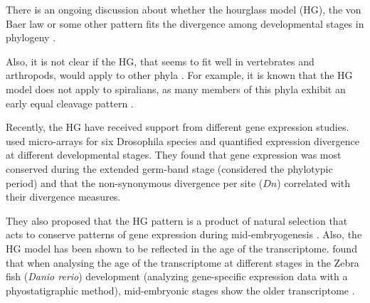 There is an ongoing discussion about whether the hourglass model (HG), the von Baer law
or some other pattern fits the divergence among developmental stages in phylogeny \citep{Richardson1997,Poe2004,Kalinka2012}.

Also, it is not clear if the HG, that seems to fit well in vertebrates and arthropods, would apply to other phyla \citep{Raff1996} \citep{Salazar-Ciudad2010}. For example, it is known that the HG model does not apply to spiralians, as many members of this phyla exhibit an early equal cleavage pattern \citep{Henry2002}.

Recently, the HG have received support from different gene expression studies.
\citet{Kalinka2010} used micro-arrays for six Drosophila species and quantified expression divergence at different developmental stages. They found that gene expression was most conserved during the extended germ-band stage (considered the phylotypic period) and that the non-synonymous divergence per site ($Dn$) correlated with their divergence measures.

They also proposed that the HG pattern is a product of natural selection that acts to conserve patterns of gene expression during mid-embryogenesis \citep{Kalinka2010}.
%
Also, the HG model has been shown to be reflected in the age of the transcriptome. \citet{Domazet-Loso2010} found that when analysing the age of the transcriptome at different stages in the Zebra fish (\textit{Danio rerio}) development (analyzing gene-specific expression data with a phyostatigraphic method), mid-embryonic stages show the older transcriptome \citep{Domazet-Loso2010}.


